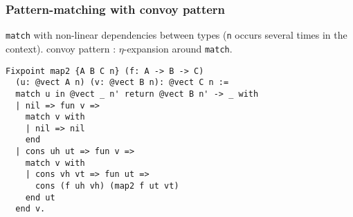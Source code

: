 \documentclass{beamer}
\begin{document}
\begin{frame}[fragile]
  \frametitle{Pattern-matching with convoy pattern}

\texttt{match} with non-linear dependencies between types (\texttt{n} occurs several times in the context).
\vfill
convoy pattern : \(\eta\)-expansion around \texttt{match}.
\vfill
\begin{verbatim}
Fixpoint map2 {A B C n} (f: A -> B -> C)
  (u: @vect A n) (v: @vect B n): @vect C n :=
  match u in @vect _ n' return @vect B n' -> _ with
  | nil => fun v =>
    match v with
    | nil => nil
    end
  | cons uh ut => fun v =>
    match v with
    | cons vh vt => fun ut =>
      cons (f uh vh) (map2 f ut vt)
    end ut
  end v.
\end{verbatim}
\end{frame}
\end{document}
